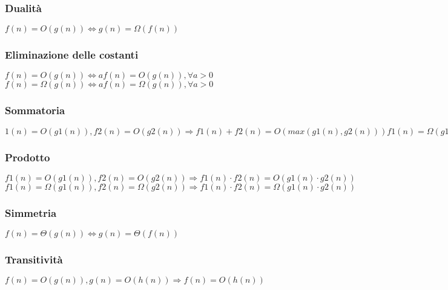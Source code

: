 \documentclass[12pt, a4paper]{article}
\begin{document}
\subsubsection*{Dualità}
\begin{center}
    $f(n) = O(g(n)) \Leftrightarrow g(n) = \Omega(f(n))$
\end{center}

\subsubsection*{Eliminazione delle costanti}
\begin{center}
    $f(n) = O(g(n)) \Leftrightarrow af(n) = O(g(n)),\forall a > 0 $\\
    $f(n) = \Omega(g(n)) \Leftrightarrow af(n) = \Omega(g(n)),\forall a > 0$
\end{center}

\subsubsection*{Sommatoria}
\begin{center}
    $1(n) = O(g1(n)),f2(n) = O(g2(n)) \Rightarrow f1(n) + f2(n) = O(max(g1(n),g2(n)))
    f1(n) = \Omega (g1(n)),f2(n) = \Omega (g2(n)) \Rightarrow f1(n) + f2(n) = \Omega (max(g1(n),g2(n)))$
\end{center}

\subsubsection*{Prodotto}
\begin{center}
    $f1(n) = O(g1(n)),f2(n) = O(g2(n)) \Rightarrow f1(n) \cdot f2(n) = O(g1(n) \cdot g2(n))$\\
    $f1(n) = \Omega (g1(n)),f2(n) = \Omega (g2(n)) \Rightarrow f1(n) \cdot f2(n) = \Omega (g1(n) \cdot g2(n))$
\end{center}

\subsubsection*{Simmetria}
\begin{center}
    $f(n) = \Theta(g(n)) \Leftrightarrow g(n) = \Theta(f(n))$
\end{center}

\subsubsection*{Transitività}
\begin{center}
    $f(n) = O(g(n)),g(n) = O(h(n)) \Rightarrow f(n) = O(h(n))$
\end{center}
\end{document}
